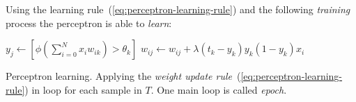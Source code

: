 Using the learning rule~(\ref{eq:perceptron-learning-rule}) and the following \emph{training} process the perceptron is able to \emph{learn}: 
\begin{algorithm}[H]
  \begin{algorithmic}
        \State $y_j \gets [\phi(\sum_{i=0}^N x_iw_{ik}) > \theta_k]$
          \State $w_{ij} \gets w_{ij} + \lambda (t_k - y_k)y_k(1 - y_k)x_i$
        \EndFor
      \EndFor
    \EndFor
  \end{algorithmic}
  \caption{Perceptron learning. Applying the \emph{weight update rule}~(\ref{eq:perceptron-learning-rule}) in loop for each sample in $T$. One main loop is called \emph{epoch}.}  
  \label{alg:perceptron-learning}
\end{algorithm} 

